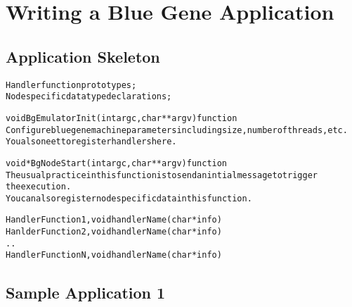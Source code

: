 \documentclass[10pt]{article}
\begin{document}
\section{Writing a Blue Gene Application}

\subsection{Application Skeleton}

\begin{alltt}
Handler function prototypes;
Node specific data type declarations;

void  BgEmulatorInit(int argc, char **argv)  function
  Configure bluegene machine parameters including size, number of threads, etc.
  You also neet to register handlers here.

void *BgNodeStart(int argc, char **argv) function
  The usual practice in this function is to send an intial message to trigger 
  the execution.
  You can also register node specific data in this function.

Handler Function 1, void handlerName(char *info)
Hanlder Function 2, void handlerName(char *info)
..
Handler Function N, void handlerName(char *info)

\end{alltt}

\subsection{Sample Application 1}
\end{document}
